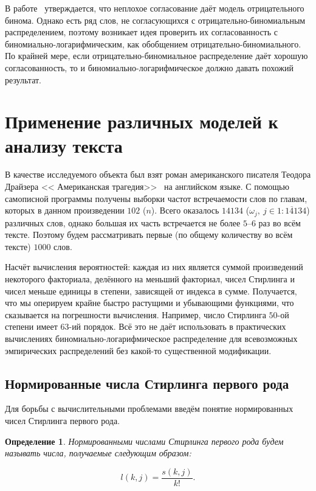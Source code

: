 \documentclass[12pt, specialist, subf, substylefile = spbu.rtx]{disser}
\newtheorem{define}{Определение}
\begin{document}
	В работе~\cite{bib:alexeevaeng2013} утверждается, что неплохое согласование даёт модель отрицательного бинома. Однако есть ряд слов, не согласующихся с отрицательно-биномиальным распределением, поэтому возникает идея проверить их согласованность с биномиально-логарифмическим, как обобщением отрицательно-биномиального. По крайней мере, если отрицательно-биномиальное распределение даёт хорошую согласованность, то и биномиально-логарифмическое должно давать похожий результат.
	
	\section{Применение различных моделей к анализу текста}
	
	В качестве исследуемого объекта был взят роман американского писателя Теодора Драйзера << Американская трагедия>>~ на английском языке. С помощью самописной программы получены выборки частот встречаемости слов по главам, которых в данном произведении $ 102 $ ($ n $). Всего оказалось $ 14134 $ ($ \omega_j,~ j \in \overline{1:14134} $) различных слов, однако большая их часть встречается не более $ 5 $--$ 6 $ раз во всём тексте. Поэтому будем рассматривать первые (по общему количеству во всём тексте) $ 1000 $ слов.
	
	Насчёт вычисления вероятностей: каждая из них является суммой произведений некоторого факториала, делённого на меньший факториал, чисел Стирлинга и чисел меньше единицы в степени, зависящей от индекса в сумме. Получается, что мы оперируем крайне быстро растущими и убывающими функциями, что сказывается на погрешности вычисления. Например, число Стирлинга $ 50 $-ой степени имеет $ 63 $-ий порядок. Всё это не даёт использовать в практических вычислениях биномиально-логарифмическое распределение для всевозможных эмпирических распределений без какой-то существенной модификации.
	
	\subsection{Нормированные числа Стирлинга первого рода}
	
	Для борьбы с вычислительными проблемами введём понятие нормированных чисел Стирлинга первого рода.
	
	\begin{define}
		Нормированными числами Стирлинга первого рода будем называть числа, получаемые следующим образом:
		
		\[
			l(k, j) = \frac {s(k, j)} {k!}.
		\]
		\label{def:3}
	\end{define}
	
\end{document}
